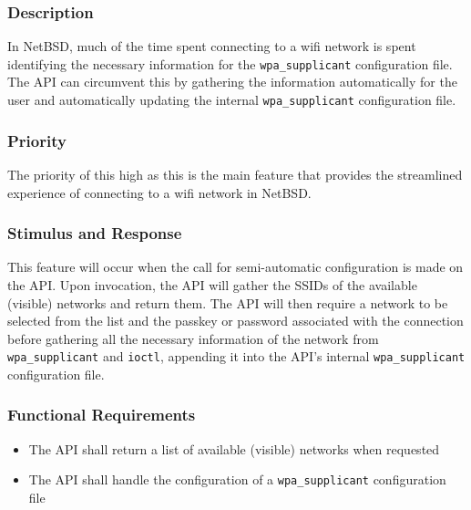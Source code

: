 \subsubsection{Description}
In NetBSD, much of the time spent connecting to a wifi network is spent identifying
the necessary information for the \texttt{wpa\_supplicant} configuration file. The API
can circumvent this by gathering the information automatically for the user
and automatically updating the internal \texttt{wpa\_supplicant} configuration file.

\subsubsection{Priority}
The priority of this high as this is the main feature that provides the streamlined
experience of connecting to a wifi network in NetBSD.

\subsubsection{Stimulus and Response}
This feature will occur when the call for semi-automatic configuration is made
on the API. Upon invocation, the API will gather the SSIDs of the available 
(visible) networks and return them. The API will then require a network to be
selected from the list and the passkey or password associated with the connection
before gathering all the necessary information of the network from \texttt{wpa\_supplicant}
and \texttt{ioctl}, appending it into the API's internal \texttt{wpa\_supplicant} configuration file.

\subsubsection{Functional Requirements}
\begin{itemize}
  \item The API shall return a list of available (visible) networks when requested
  \item The API shall handle the configuration of a \texttt{wpa\_supplicant} configuration file
\end{itemize}

